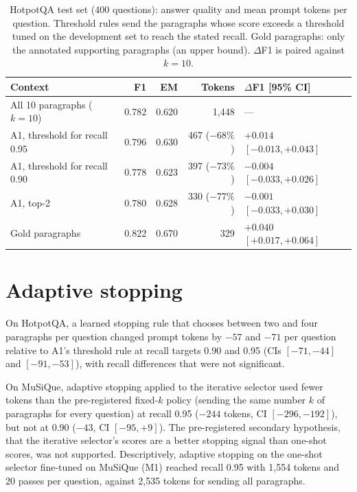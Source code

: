 \begin{table}[htbp]
\centering
\caption{HotpotQA test set (400 questions): answer quality and mean prompt tokens per question. Threshold rules send the paragraphs whose score exceeds a threshold tuned on the development set to reach the stated recall. Gold paragraphs: only the annotated supporting paragraphs (an upper bound). $\Delta$F1 is paired against $k=10$.}
\label{tab:hotpot}
\small
\begin{tabular}{lrrrl}
\toprule
Context & F1 & EM & Tokens & $\Delta$F1 [95\% CI] \\
\midrule
All 10 paragraphs ($k=10$) & 0.782 & 0.620 & 1,448 & --- \\
A1, threshold for recall 0.95 & 0.796 & 0.630 & 467 ($-68\%$) & $+0.014$ $[-0.013, +0.043]$ \\
A1, threshold for recall 0.90 & 0.778 & 0.623 & 397 ($-73\%$) & $-0.004$ $[-0.033, +0.026]$ \\
A1, top-2 & 0.780 & 0.628 & 330 ($-77\%$) & $-0.001$ $[-0.033, +0.030]$ \\
Gold paragraphs & 0.822 & 0.670 & 329 & $+0.040$ $[+0.017, +0.064]$ \\
\bottomrule
\end{tabular}
\end{table}

\section{Adaptive stopping}
\label{sec:res_adaptive}

On HotpotQA, a learned stopping rule that chooses between two and four paragraphs per question changed prompt tokens by $-57$ and $-71$ per question relative to A1's threshold rule at recall targets 0.90 and 0.95 (CIs $[-71, -44]$ and $[-91, -53]$), with recall differences that were not significant.

On MuSiQue, adaptive stopping applied to the iterative selector used fewer tokens than the pre-registered fixed-$k$ policy (sending the same number $k$ of paragraphs for every question) at recall 0.95 ($-244$ tokens, CI $[-296, -192]$), but not at 0.90 ($-43$, CI $[-95, +9]$). The pre-registered secondary hypothesis, that the iterative selector's scores are a better stopping signal than one-shot scores, was not supported. Descriptively, adaptive stopping on the one-shot selector fine-tuned on MuSiQue (M1) reached recall 0.95 with 1,554 tokens and 20 passes per question, against 2,535 tokens for sending all paragraphs.


